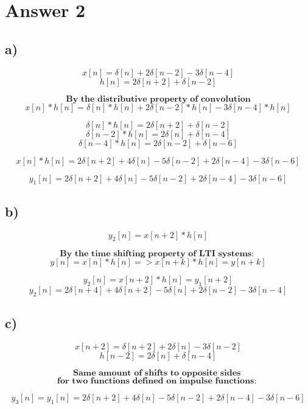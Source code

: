 \documentclass[12pt]{article}
\begin{document}
\section*{Answer 2}


\subsection*{a)} 
\[ x[n] = \delta [n] + 2\delta [n-2] - 3\delta [n-4] \]
\[ h[n] = 2\delta [n+2] + \delta [n-2] \]

\[\textbf{By the distributive property of convolution}\]
\[ x[n] * h[n] = \delta [n] * h[n] + 2\delta [n-2] * h[n] - 3\delta [n-4] * h[n] \]

\[ \delta [n] * h[n] = 2 \delta [n+2] + \delta [n-2] \]
\[ \delta [n-2] * h[n] = 2 \delta [n] + \delta [n-4] \]
\[ \delta [n-4] * h[n] = 2 \delta [n-2] + \delta [n-6]  \]

\[ x[n] * h[n] = 2 \delta [n+2] + 4 \delta [n] - 5 \delta [n-2] + 2\delta [n-4] -3\delta [n-6] \]

\[ y_1[n] = 2 \delta [n+2] + 4 \delta [n] - 5 \delta [n-2] + 2\delta [n-4] -3\delta [n-6] \]

\subsection*{b)} 
\[ y_2[n] = x[n+2] * h[n] \]

\[ \textbf{By the time shifting property of LTI systems: }\]
\[ y[n] = x[n] * h[n]  => x[n+k] * h[n] = y[n+k] \]

\[ y_2[n] = x[n+2] * h[n] = y_1[n+2]\]
\[ y_2[n] = 2 \delta [n+4] + 4 \delta [n+2] - 5 \delta [n] + 2\delta [n-2] -3\delta [n-4] \]


\subsection*{c)}
\[ x[n+2] = \delta [n+2] + 2\delta [n] - 3\delta [n-2] \]
\[ h[n-2] = 2\delta [n] + \delta [n-4] \]

\[ \textbf{Same amount of shifts to opposite sides } \]
\[ \textbf{for two functions defined on impulse functions: } \]
 
\[ y_3[n] = y_1[n] = 2 \delta [n+2] + 4 \delta [n] - 5 \delta [n-2] + 2\delta [n-4] -3\delta [n-6] \]
\end{document}
